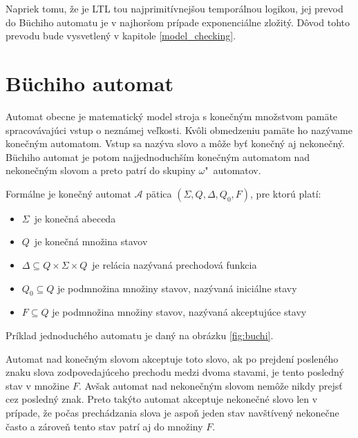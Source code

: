 \documentclass[11pt,final,oneside]{fithesis}
\begin{document}
Napriek tomu, \v ze je LTL tou najprimit\' ivnej\v sou tempor\'alnou logikou, jej prevod do B\"uchiho automatu je v najhor\v som pr\' ipade 
exponenci\' alne zlo\v zit\' y. D\^ ovod tohto prevodu bude vysvetlen\' y v kapitole \ref{model_checking}. \cite{Clarke:MC:LTL}

\section{B\"uchiho automat}	%
\label{sec:buchi}
Automat obecne je matematick\' y model stroja s kone\v cn\' ym mno\v zstvom pam\" ate spracov\' avaj\' uci vstup o nezn\' amej ve\v lkosti. 
Kv\^ oli obmedzeniu pam\" ate ho naz\' yvame kone\v cn\' ym automatom. Vstup sa naz\' yva slovo a m\^ o\v ze by\v t kone\v cn\' y aj nekone\v cn\' y.
B\" uchiho automat je potom najjednoduch\v s\' im kone\v cn\'ym automatom nad nekone\v cn\'ym slovom a preto patr\'i do skupiny {$\omega$"~au\-to\-matov}.

Form\'alne je kone\v cn\' y automat $\mathcal{A}$ p\" atica $(\Sigma, Q, \Delta, Q_0, F)$, pre ktor\' u plat\'i:
\begin{itemize}
\item $\Sigma$\ je kone\v cn\'a abeceda
\item $Q$\ je kone\v cn\'a mno\v zina stavov
\item $\Delta \subseteq Q \times \Sigma \times Q$\ je rel\' acia naz\'yvan\'a prechodov\'a funkcia
\item $Q_0 \subseteq Q$ je podmno\v zina mno\v ziny stavov, naz\' yvan\' a inici\' alne stavy
\item $F \subseteq Q$ je podmno\v zina mno\v ziny stavov, naz\'yvan\'a akceptuj\'uce stavy
\end{itemize}
Pr\'iklad jednoduch\'eho automatu je dan\'y na obr\'azku \ref{fig:buchi}.

Automat nad kone\v cn\'ym slovom akceptuje toto slovo, ak po prejden\' i poslen\'eho znaku slova zodpovedaj\' uceho prechodu medzi dvoma stavami, 
je tento posledn\' y stav v mno\v zine $F$. Av\v sak automat nad nekone\v cn\' ym slovom nem\^ o\v ze nikdy prejs\v t cez posledn\' y znak. Preto tak\' yto 
automat akceptuje nekone\v cn\' e slovo len v pr\' ipade, \v ze po\v cas prech\' adzania slova je aspo\v n jeden stav nav\v st\'iven\'y nekone\v cne \v casto 
a z\'arove\v n tento stav patr\'i aj do mno\v ziny $F$.
\end{document}
